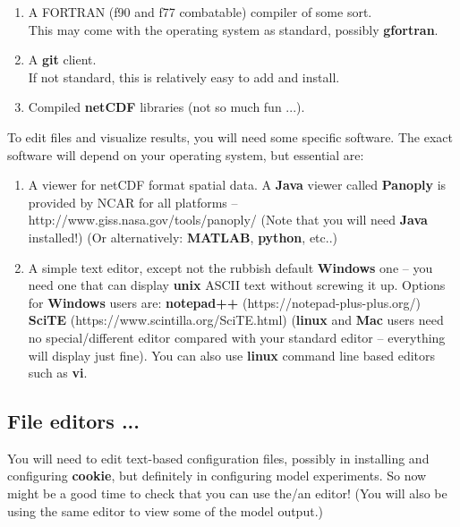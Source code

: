 \begin{enumerate}[noitemsep]
\begin{enumerate}[noitemsep]
\setlength{\itemindent}{.2in}
\item A FORTRAN (f90 and f77 combatable) compiler of some sort.
\\This may come with the operating system as standard, possibly \textbf{gfortran}.
\item A \textbf{git} client.
\\If not standard, this is relatively easy to add and install.
\item Compiled \textbf{netCDF} libraries (not so much fun ...).
\end{enumerate}
\vspace{1mm}
To edit files and visualize results, you will need some specific software. The exact software will depend on your operating system, but essential are:
\vspace{1mm}
\begin{enumerate}[noitemsep]
\setlength{\itemindent}{.2in}
\item A viewer for netCDF format spatial data. A \textbf{Java} viewer called \textbf{Panoply} is provided by NCAR for all platforms – http://www.giss.nasa.gov/tools/panoply/
(Note that you will need \textbf{Java} installed!) (Or alternatively: \textbf{MATLAB}, \textbf{python}, etc..)
\item  A simple text editor, except not the rubbish default \textbf{Windows} one – you need one that can display \textbf{unix} ASCII text without screwing it up. Options for \textbf{Windows} users are:
\textbf{notepad++} (https://notepad-plus-plus.org/)
\textbf{SciTE} (https://www.scintilla.org/SciTE.html)
(\textbf{linux} and \textbf{Mac} users need no special/different editor compared with your standard editor – everything will display just fine). You can also use \textbf{linux} command line based editors such as \textbf{vi}.
\end{enumerate}
\vspace{1mm}

\end{enumerate}
\vspace{1mm}


\subsection*{File editors ...}

You will need to edit text-based configuration files, possibly in installing and configuring \textbf{cookie}, but definitely in configuring model experiments. So now might be a good time to check that you can use the/an editor! (You will also be using the same editor to view some of the model output.)

